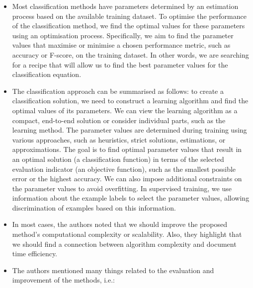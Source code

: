 \documentclass[
]{article}
\begin{document}
\begin{itemize}
\item
  Most classification methods have parameters determined by an estimation process based on the available training dataset. To optimise the performance of the classification method, we find the optimal values for these parameters using an optimisation process. Specifically, we aim to find the parameter values that maximise or minimise a chosen performance metric, such as accuracy or F-score, on the training dataset. In other words, we are searching for a recipe that will allow us to find the best parameter values for the classification equation.
\item
  The classification approach can be summarised as follows: to create a classification solution, we need to construct a learning algorithm and find the optimal values of its parameters. We can view the learning algorithm as a compact, end-to-end solution or consider individual parts, such as the learning method. The parameter values are determined during training using various approaches, such as heuristics, strict solutions, estimations, or approximations. The goal is to find optimal parameter values that result in an optimal solution (a classification function) in terms of the selected evaluation indicator (an objective function), such as the smallest possible error or the highest accuracy. We can also impose additional constraints on the parameter values to avoid overfitting. In supervised training, we use information about the example labels to select the parameter values, allowing discrimination of examples based on this information.
\item
  In most cases, the authors noted that we should improve the proposed method's computational complexity or scalability. Also, they highlight that we should find a connection between algorithm complexity and document time efficiency.
\item
  The authors mentioned many things related to the evaluation and improvement of the methods, i.e.:


\end{itemize}
\end{document}
